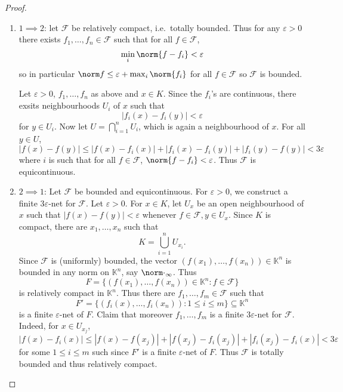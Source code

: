 \documentclass[a4paper]{article}
\newcommand{\K}{{\mathbb{K}}} %
\begin{document}
\begin{proof}\leavevmode
  \begin{enumerate}
  \item \(1 \implies 2\): let \(\mathcal F\) be relatively compact, i.e.\ totally bounded. Thus for any \(\varepsilon > 0\) there exists \(f_1, \dots, f_n \in \mathcal F\) such that for all \(f \in \mathcal F\),
    \[
      \min_i \norm{f - f_i} < \varepsilon
    \]
    so in particular \(\norm f \leq \varepsilon + \max_i \norm{f_i}\) for all \(f \in \mathcal F\) so \(\mathcal F\) is bounded.

    Let \(\varepsilon > 0\), \(f_1, \dots, f_n\) as above and \(x \in K\). Since the \(f_i\)'s are continuous, there exsits neighbourhoods \(U_i\) of \(x\) such that
    \[
      |f_i(x) - f_i(y)| < \varepsilon
    \]
    for \(y \in U_i\). Now let \(U = \bigcap_{i = 1}^n U_i\), which is again a neighbourhood of \(x\). For all \(y \in U\),
    \[
      |f(x) - f(y)|
      \leq |f(x) - f_i(x)| + |f_i(x) - f_i(y)| + |f_i(y) - f(y)|
      < 3\varepsilon
    \]
    where \(i\) is such that for all \(f \in \mathcal F\), \(\norm{f - f_i} < \varepsilon\). Thus \(\mathcal F\) is equicontinuous.
  \item \(2 \implies 1\): Let \(\mathcal F\) be bounded and equicontinuous. For \(\varepsilon > 0\), we construct a finite \(3\varepsilon\)-net for \(\mathcal F\). Let \(\varepsilon > 0\). For \(x \in K\), let \(U_x\) be an open neighbourhood of \(x\) such that \(|f(x) - f(y)| < \varepsilon\) whenever \(f \in \mathcal F, y \in U_x\). Since \(K\) is compact, there are \(x_1, \dots, x_n\) such that
    \[
      K = \bigcup_{i = 1}^n U_{x_i}.
    \]
    Since \(\mathcal F\) is (uniformly) bounded, the vector \((f(x_1), \dots, f(x_n)) \in \K^n\) is bounded in any norm on \(\K^n\), say \(\norm \cdot_\infty\). Thus
    \[
      F = \{(f(x_1), \dots, f(x_n)) \in \K^n: f \in \mathcal F\} 
    \]
    is relatively compact in \(\K^n\). Thus there are \(f_1, \dots, f_m \in \mathcal F\) such that
    \[
      F' = \{(f_i(x), \dots, f_i(x_n)): 1 \leq i \leq m\} \subseteq \K^n
    \]
    is a finite \(\varepsilon\)-net of \(F\). Claim that moreover \(f_1, \dots, f_m\) is a finite \(3\varepsilon\)-net for \(\mathcal F\). Indeed, for \(x \in U_{x_j}\),
    \[
      |f(x) - f_i(x)|
      \leq |f(x) - f(x_j)| + |f(x_j) - f_i(x_j)| + |f_i(x_j) - f_i(x)|
      < 3 \varepsilon
    \]
    for some \(1 \leq i \leq m\) such since \(F'\) is a finite \(\varepsilon\)-net of \(F\). Thus \(\mathcal F\) is totally bounded and thus relatively compact.
  \end{enumerate}
\end{proof}
\end{document}
